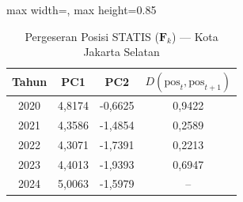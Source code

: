 \begin{table}[H]
\centering
\caption{Pergeseran Posisi STATIS ($\mathbf{F}_k$) --- Kota Jakarta Selatan} \label{tab:app2jarak_statis_skor_kota_jakarta_selatan}
\begin{adjustbox}{max width=\textwidth, max height=0.85\textheight}
\begin{tabular}{|c|c|c|c|}
\hline
\textbf{Tahun} & \textbf{PC1} & \textbf{PC2} & \textbf{$D(\text{pos}_t, \text{pos}_{t+1})$} \\
\hline
2020 & 4,8174 & -0,6625 & 0,9422 \\
2021 & 4,3586 & -1,4854 & 0,2589 \\
2022 & 4,3071 & -1,7391 & 0,2213 \\
2023 & 4,4013 & -1,9393 & 0,6947 \\
2024 & 5,0063 & -1,5979 & -- \\
\hline
\end{tabular}
\end{adjustbox}
\end{table}